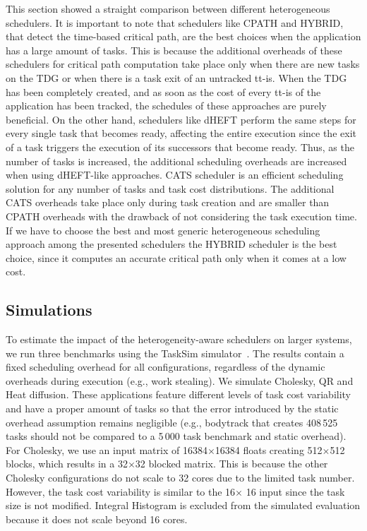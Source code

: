 This section showed a straight comparison between different heterogeneous schedulers.
It is important to note that schedulers like CPATH and HYBRID, that detect the time-based critical path, are the best choices when the application has a large amount of tasks.
This is because the additional overheads of these schedulers for critical path computation take place only when there are new tasks on the TDG or when there is a task exit of an untracked tt-is. 
When the TDG has been completely created, and as soon as the cost of every tt-is of the application has been tracked, the schedules of these approaches are purely beneficial.
On the other hand, schedulers like dHEFT perform the same steps for every single task that becomes ready, affecting the entire execution since the exit of a task triggers the execution of its successors that become ready. 
Thus, as the number of tasks is increased, the additional scheduling overheads are increased when using dHEFT-like approaches.
CATS scheduler is an efficient scheduling solution for any number of tasks and task cost distributions.
The additional CATS overheads take place only during task creation and are smaller than CPATH overheads with the drawback of not considering the task execution time.
If we have to choose the best and most generic heterogeneous scheduling approach among the presented schedulers the HYBRID scheduler is the best choice, since it computes an accurate critical path only when it comes at a low cost.


\subsection{Simulations}
To estimate the impact of the heterogeneity-aware schedulers on larger systems, we run three benchmarks using the TaskSim simulator~\cite{AbstrLevels_TACO12}.
The results contain a fixed scheduling overhead for all configurations, regardless of the dynamic overheads during execution (e.g., work stealing).
We simulate Cholesky, QR and Heat diffusion.
These applications feature different levels of task cost variability and have a proper amount of tasks so that the error introduced by the static overhead assumption remains negligible (e.g., bodytrack that creates 408\,525 tasks should not be compared to a 5\,000 task benchmark and static overhead).
For Cholesky, we use an input matrix of 16384$\times$16384 floats creating 512$\times$512 blocks, which results in a 32$\times$32 blocked matrix. This is because the other Cholesky configurations do not scale to 32 cores due to the limited task number. However, the task cost variability is similar to the 16$\times$ 16 input since the task size is not modified. Integral Histogram is excluded from the simulated evaluation because it does not scale beyond 16 cores.

